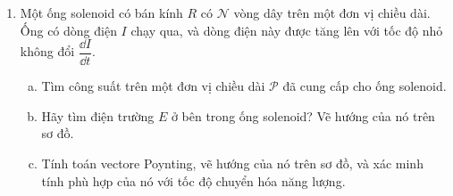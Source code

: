 \begin{vd}
\begin{enumerate}[1)]
\begin{enumerate}[a)]
    \end{enumerate}
    \item Một ống solenoid có bán kính $R$ có $\mathcal{N}$ vòng dây trên một đơn vị chiều dài. Ống có dòng điện $I$ chạy qua, và dòng điện này được tăng lên với tốc độ nhỏ không đổi $\dfrac{\dd I}{\dd t}$.
    \begin{enumerate}[a)]
        \item Tìm công suất trên một đơn vị chiều dài $\mathcal{P}$ đã cung cấp cho ống solenoid.
        \item Hãy tìm điện trường $E$ ở bên trong ống solenoid? Vẽ hướng của nó trên sơ đồ.
        \item Tính toán vectore Poynting, vẽ hướng của nó trên sơ đồ, và xác minh tính phù hợp của nó với tốc độ chuyển hóa năng lượng.
    \end{enumerate}
\end{enumerate}
\end{vd}
